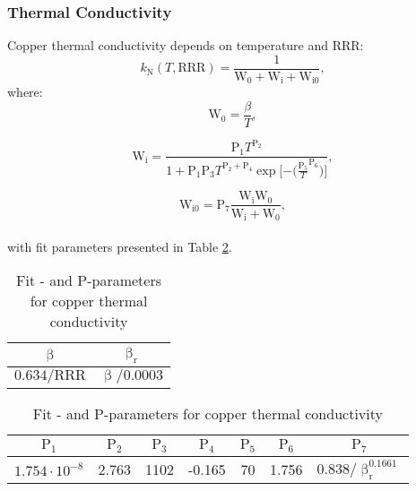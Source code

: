 \subsubsection{Thermal Conductivity}
Copper thermal conductivity depends on temperature and RRR:
\begin{equation}
    k_\text{N}(T, \text{RRR}) = \frac{1}{\text{W}_\text{0} + \text{W}_\text{i} + \text{W}_\text{i0}}, 
\end{equation}
where:
\begin{equation}
    \text{W}_\text{0} = \frac{\beta}{T},
\end{equation}

\begin{equation}
    \text{W}_\text{i} = \frac{\text{P}_\text{1} T^{\text{P}_\text{2}}}{1+\text{P}_\text{1}  \text{P}_\text{3}  T^{\text{P}_\text{2} + \text{P}_\text{4}}  \exp{[-(\frac{\text{P}_\text{5}}{T}}^{\text{P}_\text{6}})]},
\end{equation}

\begin{equation}
    \text{W}_\text{i0} = \text{P}_\text{7} \frac{\text{W}_\text{i} \text{W}_\text{0}}{\text{W}_\text{i} + \text{W}_\text{0}},
\end{equation}
\\
with fit parameters presented in Table \ref{table:nist_cu_k_parameters}.

\begin{table}[h!]
    \caption{Fit \textbeta- and P-parameters for copper thermal conductivity} 
    \vspace{-1.em} 
    \fontsize{10}{10}
    \selectfont 
    \renewcommand{\arraystretch}{1.5}
    \begin{center}
    \begin{tabular}{ cc }  
    $\upbeta$ & $\upbeta_\text{r}$ \\
    \hline
    $0.634/\text{RRR}$ & $\upbeta/0.0003$ \\
    \hline
    \end{tabular}
    
    \begin{tabular}{ ccccccc }  
    $\text{P}_1$ & $\text{P}_2$ & $\text{P}_3$ & $\text{P}_4$ & $\text{P}_5$ & $\text{P}_6$ & $\text{P}_7$ \\
    \hline
    $1.754\cdot10^{-8}$ & 2.763 & 1102 & -0.165 & 70 & 1.756 & $0.838/\upbeta_\text{r}^{0.1661}$ \\
    \hline 
    \end{tabular}
    \end{center}  
     \label{table:nist_cu_k_parameters} 
 \end{table}
 
